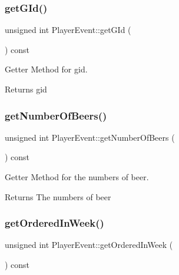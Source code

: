 \subsubsection{\texorpdfstring{get\+G\+Id()}{getGId()}}
{\footnotesize\ttfamily unsigned int Player\+Event\+::get\+G\+Id (\begin{DoxyParamCaption}{ }\end{DoxyParamCaption}) const}



Getter Method for gid. 

\begin{DoxyReturn}{Returns}
gid 
\end{DoxyReturn}
\mbox{\label{classPlayerEvent_aebdec1d24172c7d3cefa6e76ac51f490}} 
\subsubsection{\texorpdfstring{get\+Number\+Of\+Beers()}{getNumberOfBeers()}}
{\footnotesize\ttfamily unsigned int Player\+Event\+::get\+Number\+Of\+Beers (\begin{DoxyParamCaption}{ }\end{DoxyParamCaption}) const}



Getter Method for the numbers of beer. 

\begin{DoxyReturn}{Returns}
The numbers of beer 
\end{DoxyReturn}
\mbox{\label{classPlayerEvent_a9b9f5598c419cebae94fed31d209a09b}} 
\subsubsection{\texorpdfstring{get\+Ordered\+In\+Week()}{getOrderedInWeek()}}
{\footnotesize\ttfamily unsigned int Player\+Event\+::get\+Ordered\+In\+Week (\begin{DoxyParamCaption}{ }\end{DoxyParamCaption}) const}



